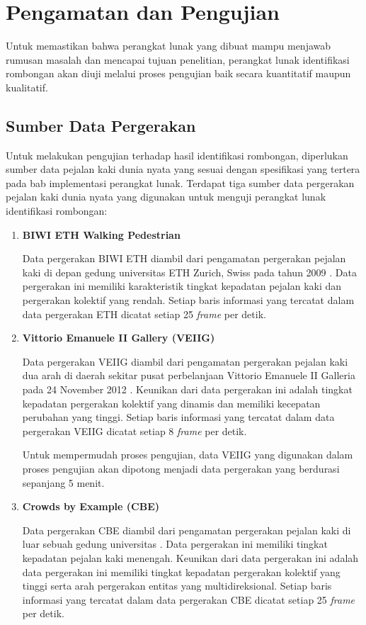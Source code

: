 \chapter{Pengamatan dan Pengujian}
\label{chap:pengujian}

Untuk memastikan bahwa perangkat lunak yang dibuat mampu menjawab rumusan masalah dan mencapai tujuan penelitian, perangkat lunak identifikasi rombongan akan diuji melalui proses pengujian baik secara kuantitatif maupun kualitatif.

\section{Sumber Data Pergerakan}
\label{bab6:data-pergerakan}

Untuk melakukan pengujian terhadap hasil identifikasi rombongan, diperlukan sumber data pejalan kaki dunia nyata yang sesuai dengan spesifikasi yang tertera pada bab implementasi perangkat lunak. Terdapat tiga sumber data pergerakan pejalan kaki dunia nyata yang digunakan untuk menguji perangkat lunak identifikasi rombongan:

\begin{enumerate}
    \item \textbf{BIWI ETH Walking Pedestrian}
    
    Data pergerakan BIWI ETH diambil dari pengamatan pergerakan pejalan kaki di depan gedung universitas ETH Zurich, Swiss pada tahun 2009 \cite{pellegrini:eth}. Data pergerakan ini memiliki karakteristik tingkat kepadatan pejalan kaki dan pergerakan kolektif yang rendah. Setiap baris informasi yang tercatat dalam data pergerakan ETH dicatat setiap 2\.5 \textit{frame} per detik.
    
    \item \textbf{Vittorio Emanuele II Gallery (VEIIG)}
    
    Data pergerakan VEIIG diambil dari pengamatan pergerakan pejalan kaki dua arah di daerah sekitar pusat perbelanjaan Vittorio Emanuele II Galleria pada 24 November 2012 \cite{bandini:gveii}. Keunikan dari data pergerakan ini adalah tingkat kepadatan pergerakan kolektif yang dinamis dan memiliki kecepatan perubahan yang tinggi. Setiap baris informasi yang tercatat dalam data pergerakan VEIIG dicatat setiap 8 \textit{frame} per detik.
    
    Untuk mempermudah proses pengujian, data VEIIG yang digunakan dalam proses pengujian akan dipotong menjadi data pergerakan yang berdurasi sepanjang 5 menit.
    
    \item \textbf{Crowds by Example (CBE)}
    
    Data pergerakan CBE diambil dari pengamatan pergerakan pejalan kaki di luar sebuah gedung universitas \cite{solera:06:range-reference}. Data pergerakan ini memiliki tingkat kepadatan pejalan kaki menengah. Keunikan dari data pergerakan ini adalah data pergerakan ini memiliki tingkat kepadatan pergerakan kolektif yang tinggi serta arah pergerakan entitas yang multidireksional. Setiap baris informasi yang tercatat dalam data pergerakan CBE dicatat setiap 25 \textit{frame} per detik.
\end{enumerate}


